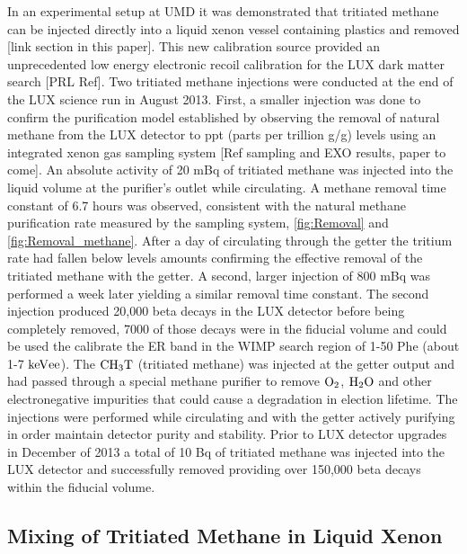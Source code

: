 In an experimental setup at UMD it was demonstrated that tritiated methane can be injected directly into a liquid xenon vessel containing plastics and removed [link section in this paper]. This new calibration source provided an unprecedented low energy electronic recoil calibration for the LUX dark matter search [PRL Ref].  Two tritiated methane injections were conducted at the end of the LUX science run in August 2013. First, a smaller injection was done to confirm the purification model established by observing the removal of natural methane from the LUX detector to ppt (parts per trillion g/g) levels using an integrated xenon gas sampling system [Ref sampling and EXO results, paper to come]. An absolute activity of 20 mBq of tritiated methane was injected into the liquid volume at the purifier's outlet while circulating. A methane removal time constant of 6.7 hours was observed, consistent with the natural methane purification rate measured by the sampling system, \ref{fig:Removal} and \ref{fig:Removal_methane}. After a day of circulating through the getter the tritium rate had fallen below levels amounts confirming the effective removal of the tritiated methane with the getter. A second, larger injection of 800 mBq was performed a week later yielding a similar removal time constant. The second injection produced 20,000 beta decays in the LUX detector before being completely removed, 7000 of those decays were in the fiducial volume and could be used the calibrate the ER band in the WIMP search region of 1-50 Phe (about 1-7 $\rm keV{ee}$). 
The $\rm CH_3T$ (tritiated methane) was injected at the getter output and had passed through a special methane purifier to remove $\rm O_2$, $\rm H_2O$ and other electronegative impurities that could cause a degradation in election lifetime. The injections were performed while circulating and with the getter actively purifying in order maintain detector purity and stability. Prior to LUX detector upgrades in December of 2013 a total of 10 Bq of tritiated methane was injected into the LUX detector and successfully removed providing over 150,000 beta decays within the fiducial volume.  



\subsection{Mixing of Tritiated Methane in Liquid Xenon}

